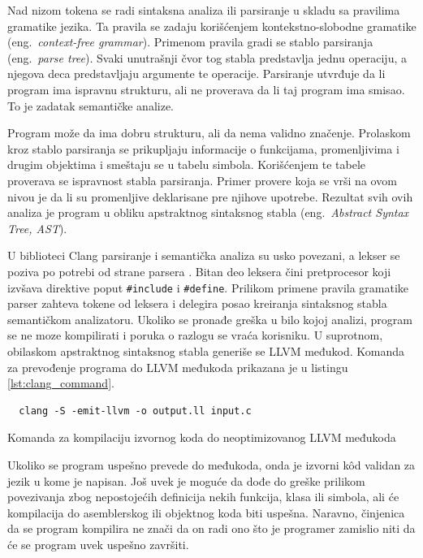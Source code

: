 \documentclass[12pt,oneside]{memoir}
\begin{document}
Nad nizom tokena se radi sintaksna analiza ili parsiranje u skladu sa pravilima gramatike jezika.
Ta pravila se zadaju korišćenjem kontekstno-slobodne gramatike (eng.~{\em context-free grammar}).
Primenom pravila gradi se stablo parsiranja (eng.~{\em parse tree}).
Svaki unutrašnji čvor tog stabla predstavlja jednu operaciju, a njegova deca predstavljaju argumente te operacije.
Parsiranje utvrđuje da li program ima ispravnu strukturu, ali ne proverava da li taj program ima smisao.
To je zadatak semantičke analize.

Program može da ima dobru strukturu, ali da nema validno značenje.
Prolaskom kroz stablo parsiranja se prikupljaju informacije o funkcijama, promenljivima i drugim objektima i smeštaju se u tabelu simbola.
Korišćenjem te tabele proverava se ispravnost stabla parsiranja.
Primer provere koja se vrši na ovom nivou je da li su promenljive deklarisane pre njihove upotrebe.
Rezultat svih ovih analiza je program u obliku apstraktnog sintaksnog stabla (eng.~{\em Abstract Syntax Tree, AST}).

U biblioteci Clang parsiranje i semantička analiza su usko povezani, a lekser se poziva po potrebi od strane parsera \cite{stulova2019overview}.
Bitan deo leksera čini pretprocesor koji izvšava direktive poput \verb|#include| i \verb|#define|.
Prilikom primene pravila gramatike parser zahteva tokene od leksera i delegira posao kreiranja sintaksnog stabla semantičkom analizatoru.
Ukoliko se pronađe greška u bilo kojoj analizi, program se ne moze kompilirati i poruka o razlogu se vraća korisniku.
U suprotnom, obilaskom apstraktnog sintaksnog stabla generiše se LLVM međukod.
Komanda za prevođenje programa do LLVM međukoda prikazana je u listingu \ref{lst:clang_command}.

\begin{listing}[!ht]
\begin{verbatim}
  clang -S -emit-llvm -o output.ll input.c
\end{verbatim}
\caption{Komanda za kompilaciju izvornog koda do neoptimizovanog LLVM međukoda}
\label{lst:clang_command}
\end{listing}

Ukoliko se program uspešno prevede do međukoda, onda je izvorni k\^od validan za jezik u kome je napisan.
Još uvek je moguće da dođe do greške prilikom povezivanja zbog nepostojećih definicija nekih funkcija, klasa ili simbola, ali će kompilacija do asemblerskog ili objektnog koda biti uspešna.
Naravno, činjenica da se program kompilira ne znači da on radi ono što je programer zamislio niti da će se program uvek uspešno završiti.
\end{document}
